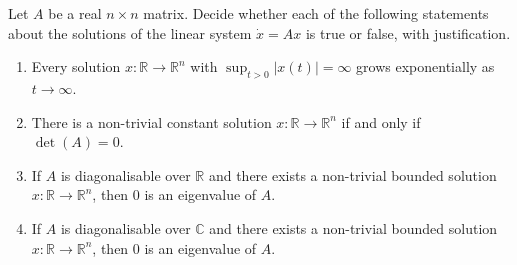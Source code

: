 \begin{exercise}
\label{ex:linear_system_boundedness_spectrum}
Let $A$ be a real $n\times n$ matrix. Decide whether each of the following statements about the
solutions of the linear system $\dot x = Ax$ is true or false, with justification.
\begin{enumerate}[label=\textbf{(\alph*)}]
  \item Every solution $x : \mathbb{R} \to \mathbb{R}^n$ with $\sup_{t>0}\lvert x(t)\rvert =
    \infty$ grows exponentially as $t \to \infty$.
  \item There is a non-trivial constant solution $x : \mathbb{R} \to \mathbb{R}^n$ if and only if
    $\det(A) = 0$.
  \item If $A$ is diagonalisable over $\mathbb{R}$ and there exists a non-trivial bounded
    solution $x : \mathbb{R} \to \mathbb{R}^n$, then $0$ is an eigenvalue of $A$.
  \item If $A$ is diagonalisable over $\mathbb{C}$ and there exists a non-trivial bounded
    solution $x : \mathbb{R} \to \mathbb{R}^n$, then $0$ is an eigenvalue of $A$.
\end{enumerate}
\end{exercise}

